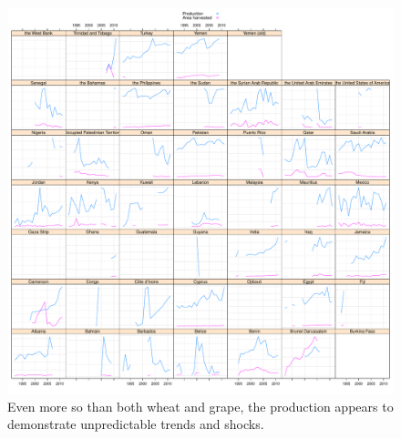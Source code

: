 \documentclass[nojss]{jss}\usepackage[]{graphicx}\usepackage[]{color}
\makeatletter
\def\maxwidth{ %
  \ifdim\Gin@nat@width>\linewidth
    \linewidth
  \else
    \Gin@nat@width
  \fi
}
\newenvironment{knitrout}{}{} %
\makeatother
\begin{document}
\begin{knitrout}
\color{fgcolor}\begin{figure}[!ht]


{\centering \includegraphics[width=\maxwidth]{figure/okra-production-area-explore} 

}

\caption[Even more so than both wheat and grape, the production appears to demonstrate unpredictable trends and shocks]{Even more so than both wheat and grape, the production appears to demonstrate unpredictable trends and shocks.\label{fig:okra-production-area-explore}}
\end{figure}


\end{knitrout}
\end{document}
